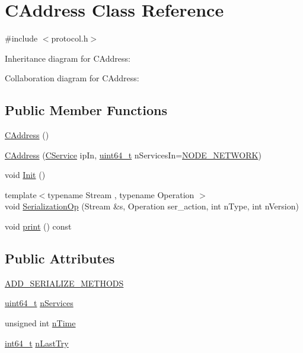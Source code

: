 \hypertarget{class_c_address}{}\section{C\+Address Class Reference}
\label{class_c_address}


{\ttfamily \#include $<$protocol.\+h$>$}



Inheritance diagram for C\+Address\+:


Collaboration diagram for C\+Address\+:
\subsection*{Public Member Functions}
\begin{DoxyCompactItemize}
\item 
\hyperlink{class_c_address_a84cd336180580ab69b8888a4339ccc37}{C\+Address} ()
\item 
\hyperlink{class_c_address_a806e75f363ec49bfab92a686a8774ac3}{C\+Address} (\hyperlink{class_c_service}{C\+Service} ip\+In, \hyperlink{stdint_8h_aaa5d1cd013383c889537491c3cfd9aad}{uint64\+\_\+t} n\+Services\+In=\hyperlink{protocol_8h_abc5c98fcc1211af2b80116dd6e0a035da9d1154f0e7e56f183a5c8373abe2e86c}{N\+O\+D\+E\+\_\+\+N\+E\+T\+W\+O\+R\+K})
\item 
void \hyperlink{class_c_address_ac060c84dcf47b8ccfae0142c9b29a243}{Init} ()
\item 
{\footnotesize template$<$typename Stream , typename Operation $>$ }\\void \hyperlink{class_c_address_aec10c7075404eefbcf6f7a4c5671be02}{Serialization\+Op} (Stream \&s, Operation ser\+\_\+action, int n\+Type, int n\+Version)
\item 
void \hyperlink{class_c_address_a0554ba38d96380c57bc193fa416cee65}{print} () const 
\end{DoxyCompactItemize}
\subsection*{Public Attributes}
\begin{DoxyCompactItemize}
\item 
\hyperlink{class_c_address_a9582fc22433b2ed275d4b65fb72551e7}{A\+D\+D\+\_\+\+S\+E\+R\+I\+A\+L\+I\+Z\+E\+\_\+\+M\+E\+T\+H\+O\+D\+S}
\item 
\hyperlink{stdint_8h_aaa5d1cd013383c889537491c3cfd9aad}{uint64\+\_\+t} \hyperlink{class_c_address_a6a4a6aa020d0d558f238c7d04dd986c3}{n\+Services}
\item 
unsigned int \hyperlink{class_c_address_ac1c44aac968b11f90ce529b133ae4e9b}{n\+Time}
\item 
\hyperlink{stdint_8h_adec1df1b8b51cb32b77e5b86fff46471}{int64\+\_\+t} \hyperlink{class_c_address_abcf198429efe135fa2424f7dbc0048b0}{n\+Last\+Try}
\end{DoxyCompactItemize}
